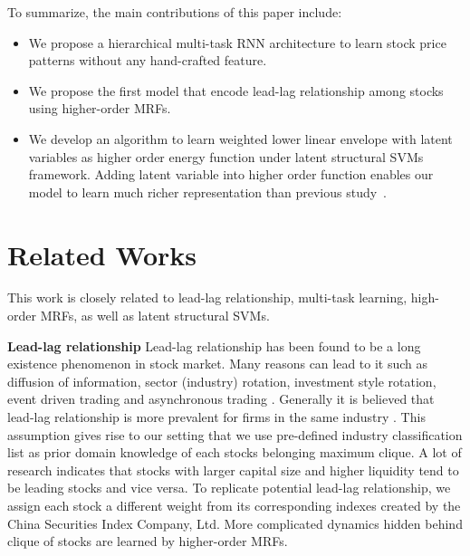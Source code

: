 \documentclass[sigconf]{acmart}
\renewcommand{\cite}{\citep}
\begin{document}
To summarize, the main contributions of this paper include: 
\begin{itemize}
\item  We propose a hierarchical multi-task RNN architecture to learn stock price
patterns without any hand-crafted feature.
\item We propose the first model that encode lead-lag relationship among stocks using
higher-order MRFs. 
\item We develop an algorithm to learn weighted lower linear envelope with latent variables as higher order energy function under latent structural SVMs framework. Adding latent variable into higher order function
enables our model to learn much richer representation than
previous study~\cite{gouldlearning}.
\end{itemize}

\section{Related Works}
\label{sec:background}
This work is closely related to lead-lag relationship, multi-task learning, high-order MRFs, as well as latent structural SVMs.

\textbf{Lead-lag relationship} Lead-lag relationship has been found to be a long existence phenomenon in stock market. Many reasons can lead to it such as diffusion of information, sector (industry) rotation, investment style rotation, event driven trading and asynchronous trading
\cite{lo1990contrarian,chordia2000trading,conrad1988time,hameed1997time}. Generally it is believed that lead-lag relationship is more prevalent for firms in the same industry \cite{hou2007industry}. This assumption gives rise to our setting that we use pre-defined industry classification list \cite{ths} as prior domain knowledge of each stock\textquotesingle s belonging maximum
clique. A lot of research \cite{brennan1993investment,hou2007industry,badrinath1995shepherds,mcqueen1996delayed}
indicates that stocks with larger capital size and higher liquidity tend to be leading stocks and vice versa.
To replicate potential lead-lag relationship, we assign each stock a different weight from its corresponding indexes created by the China Securities Index Company, Ltd. More complicated dynamics hidden behind clique
of stocks are learned by higher-order MRFs.
\end{document}

